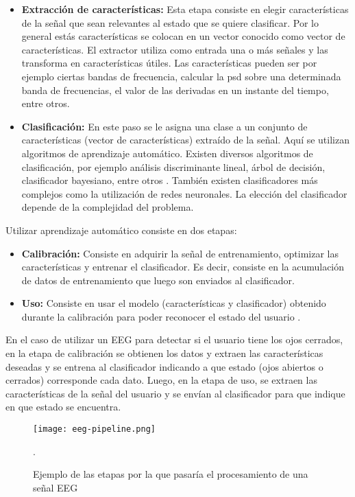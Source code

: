 \begin{itemize}
  \item \textbf{Extracción de características:} Esta etapa consiste en elegir características de la señal que sean relevantes al estado que se quiere clasificar. Por lo general estás características se colocan en un vector conocido como vector de características. El extractor utiliza como entrada una o más señales y las transforma en características útiles. Las características pueden ser por ejemplo ciertas bandas de frecuencia, calcular la \acrshort{psd} sobre una determinada banda de frecuencias, el valor de las derivadas en un instante del tiempo, entre otros. 
  \item \textbf{Clasificación:} En este paso se le asigna una clase a un conjunto de características (vector de características) extraído de la señal. Aquí se utilizan algoritmos de aprendizaje automático. Existen diversos algoritmos de clasificación, por ejemplo análisis discriminante lineal, árbol de decisión, clasificador bayesiano, entre otros \cite{eeg-tutorial}. También existen clasificadores más complejos como la utilización de redes neuronales. La elección del clasificador depende de la complejidad del problema.
\end{itemize}

Utilizar aprendizaje automático consiste en dos etapas:

\begin{itemize}
	\item \textbf{Calibración:} Consiste en adquirir la señal de entrenamiento, optimizar las características y entrenar el clasificador. Es decir, consiste en la acumulación de datos de entrenamiento que luego son enviados al clasificador.
	\item \textbf{Uso:} Consiste en usar el modelo (características y clasificador) obtenido durante la calibración para poder reconocer el estado del usuario \cite{eeg-tutorial}. 
\end{itemize}

En el caso de utilizar un EEG para detectar si el usuario tiene los ojos cerrados, en la etapa de calibración se obtienen los datos y extraen las características deseadas y se entrena al clasificador indicando a que estado (ojos abiertos o cerrados) corresponde cada dato. Luego, en la etapa de uso, se extraen las características de la señal del usuario y se envían al clasificador para que indique en que estado se encuentra.

\begin{figure}[H]
	\centering
    \texttt{[image: eeg-pipeline.png]}
    \caption{Ejemplo de las etapas por la que pasaría el procesamiento de una señal EEG \cite{eeg-tutorial}}.
	\label{fig:eeg-pipeline}
\end{figure}

